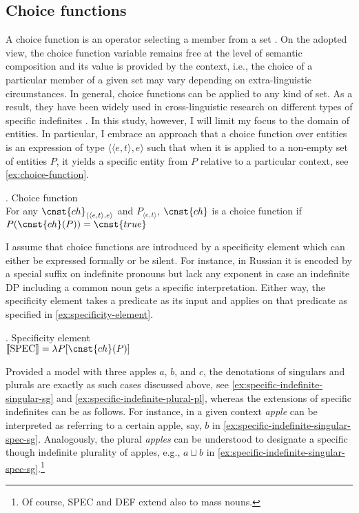 	\subsection{Choice functions}\label{sec:choice-functions}
	
	A choice function is an operator selecting a member from a set \citep{reinhart1997quantifier,kratzer1998scope}. On the adopted view, the choice function variable remains free at the level of semantic composition and its value is provided by the context, i.e., the choice of a particular member of a given set may vary depending on extra-linguistic circumstances. In general, choice functions can be applied to any kind of set. As a result, they have been widely used in cross-linguistic research on different types of specific indefinites \citep[see, e.g.,][]{matthewson1998interpretation,kratzer_shimoyama2002indeterminate,alonso-ovalle_menendez-benito2003some,yanovich2005choice,wagiel2020several}. In this study, however, I will limit my focus to the domain of entities. In particular, I embrace an approach that a choice function  over entities is an expression of type $\langle\langle e, t\rangle, e\rangle$ such that when it is applied to a non-empty set of entities $P$, it yields a specific entity from $P$ relative to a particular context, see \ref{ex:choice-function}.
	
	\ex. Choice function\\
	For any $\cnst{ch}_{\langle\langle e, t\rangle, e\rangle}$ and $P_{\langle e, t\rangle}$, $\cnst{ch}$ is a choice function if $P(\cnst{ch}(P)) = \cnst{true}$\label{ex:choice-function}
	
	I assume that choice functions are introduced by a specificity element which can either be expressed formally or be silent. For instance, in Russian it is encoded by a special suffix on indefinite pronouns \citep[see, e.g.,][]{yanovich2005choice} but lack any exponent in case an indefinite DP including a common noun gets a specific interpretation. Either way, the specificity element takes a predicate as its input and applies  on that predicate as specified in \ref{ex:specificity-element}.
	
	\ex. Specificity element\\
	$\llbracket \text{SPEC}\rrbracket = \lambda P [\cnst{ch}(P)]$\label{ex:specificity-element}
	
	Provided a model with three apples $a$, $b$, and $c$, the denotations of singulars and plurals are exactly as such cases discussed above, see \ref{ex:specific-indefinite-singular-sg} and \ref{ex:specific-indefinite-plural-pl}, whereas the extensions of specific indefinites can be as follows. For instance, in a given context \textit{apple} can be interpreted as referring to a certain apple, say, $b$ in \ref{ex:specific-indefinite-singular-spec-sg}. Analogously, the plural \textit{apples} can be understood to designate a specific though indefinite plurality of apples, e.g., $a\sqcup b$ in \ref{ex:specific-indefinite-singular-spec-sg}.\footnote{Of course, SPEC and DEF extend also to mass nouns.}
	
